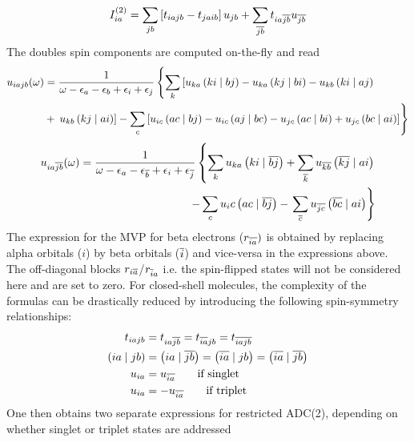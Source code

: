 \begin{equation}
I_{ia}^{(2)} = \sum_{jb} \left[ t_{iajb} - t_{jaib} \right] u_{jb} + \sum_{\overline{jb}} t_{ia\overline{jb}} u_{\overline{jb}}
\end{equation}
\noindent The doubles spin components are computed on-the-fly and read
\begin{equation}
\begin{split}
u_{iajb}(\omega) &= \frac{1}{\omega - \epsilon_a - \epsilon_b + \epsilon_i + \epsilon_j} \left\lbrace \sum_k \left[ u_{ka} \left( ki \mid bj \right) - u_{ka} \left( kj \mid bi \right) - u_{kb} \left( ki \mid aj \right) \right. \right. \\
&+ \left. \left. u_{kb} \left( kj \mid ai \right) \right] - \sum_c \left[ u_{ic} \left( ac \mid bj \right) - u_{ic} \left( aj \mid bc \right) - u_{jc} \left( ac \mid bi \right) + u_{jc} \left( bc \mid ai \right) \right] \right\rbrace
\end{split}
\end{equation}
\begin{equation}
\begin{split}
u_{ia\overline{jb}}(\omega) = \frac{1}{\omega - \epsilon_a - \epsilon_{\overline{b}} + \epsilon_i + \epsilon_{\overline{j}}} \left\lbrace \sum_k u_{ka} \left( ki \mid \overline{bj} \right) + \sum_{\overline{k}} u_{\overline{kb}} \left( \overline{kj} \mid ai \right) \right. \\ - \sum_c u_ic \left( ac \mid \overline{bj} \right) - \left. \sum_{\overline{c}} u_{\overline{jc}} \left( \overline{bc} \mid ai \right) \right\rbrace
\end{split}
\end{equation}
\noindent The expression for the MVP for beta electrons ($r_{\overline{ia}})$ is obtained by replacing alpha orbitals ($i$) by beta orbitals ($\overline{i}$) and vice-versa in the expressions above. The off-diagonal blocks $r_{i\overline{a}}$/$r_{\overline{i} a}$ i.e. the spin-flipped states will not be considered here and are set to zero. For closed-shell molecules, the complexity of the formulas can be drastically reduced by introducing the following spin-symmetry relationships:
\begin{align}
t_{iajb} &= t_{ia\overline{jb}} = t_{\overline{ia}jb} = t_{\overline{iajb}}   \label{eq:SPIN1}\\
\left( ia \mid jb \right) &= \left( ia \mid \overline{jb} \right) = \left( \overline{ia} \mid jb \right) = \left( \overline{ia} \mid \overline{jb} \right) \label{eq:SPIN2} \\
u_{ia} &= u_{\overline{ia}} \qquad \textrm{if singlet} \label{eq:SPIN3} \\
u_{ia} &= - u_{\overline{ia}} \qquad \textrm{if triplet} \label{eq:SPIN4}
\end{align}
\noindent One then obtains two separate expressions for restricted ADC(2), depending on whether singlet or triplet states are addressed

